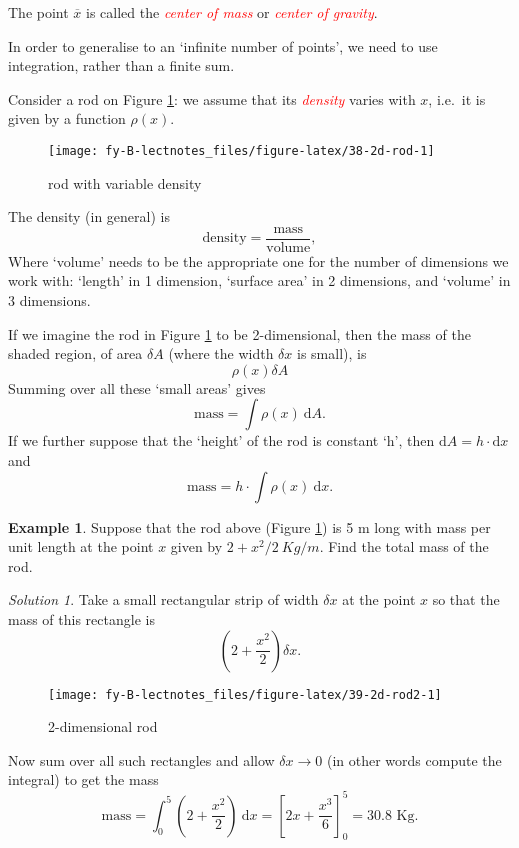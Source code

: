 \documentclass[
  11pt,
  oneside]{book}
\newcommand{\slide}{}
\theoremstyle{definition}
\theoremstyle{definition}
\newtheorem{example}{Example}[chapter]
\theoremstyle{definition}
\theoremstyle{definition}
\theoremstyle{remark}
\newtheorem*{solution}{Solution}
\begin{document}
The point \(\overline x\) is called the \textcolor{red}{\em center of mass} or \textcolor{red}{\em center of gravity}.
\slide

In order to generalise to an `infinite number of points', we need to use integration, rather than a finite sum.

Consider a rod on Figure \ref{fig:38-2d-rod}: we assume that its \textcolor{red}{\em density} varies with \(x\), i.e.~it is given by a function \(\rho(x)\).

\begin{figure}

{\centering \texttt{[image: fy-B-lectnotes\_files/figure-latex/38-2d-rod-1]} 

}

\caption{rod with variable density}\label{fig:38-2d-rod}
\end{figure}
\slide

The density (in general) is
\[
\text{density} = \frac{\text{mass}}{\text{volume}},
\]
Where `volume' needs to be the appropriate one for the number of dimensions we work with: `length' in 1 dimension, `surface area' in 2 dimensions, and `volume' in 3 dimensions.

\slide

If we imagine the rod in Figure \ref{fig:38-2d-rod} to be 2-dimensional, then
the mass of the shaded region, of area \(\delta A\) (where the width \(\delta x\) is small), is
\[
\rho(x)\delta A
\]
Summing over all these `small areas' gives
\[
\text{mass} = \int\rho(x)\ \mathrm{d}A.
\]
If we further suppose that the `height' of the rod is constant `h', then \(\mathrm{d}A=h\cdot\mathrm{d}x\) and
\[
\text{mass} = h\cdot \int\rho(x)\ \mathrm{d}x.
\]
\slide

\begin{example}
Suppose that the rod above (Figure \ref{fig:38-2d-rod}) is 5 m long with mass per unit length at the point \(x\) given by \(2+x^2/2\ Kg/m\). Find the total mass of the rod.
\end{example}

\begin{solution}
\leavevmode

Take a small rectangular strip of width \(\delta x\) at the point \(x\) so that the mass of this rectangle is
\[
\left(2+\frac{x^2}2\right)\delta x.
\]

\begin{figure}

{\centering \texttt{[image: fy-B-lectnotes\_files/figure-latex/39-2d-rod2-1]} 

}

\caption{2-dimensional rod}\label{fig:39-2d-rod2}
\end{figure}

Now sum over all such rectangles and allow \(\delta x \to 0\) (in other words compute the integral) to get the mass
\[
\text{mass} = \int_0^5\left(2+\frac{x^2}{2}\right)\ \mathrm{d}x = \left[2x+\frac{x^3}{6}\right]_0^5 = 30.8\text{ Kg}.
\]

\end{solution}
\end{document}
